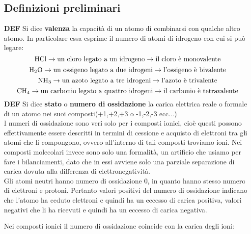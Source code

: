 \subsection{Definizioni preliminari}
\textbf{DEF} Si dice \textbf{valenza} la capacità di un atomo di combinarsi con qualche altro atomo. In particolare essa esprime il numero di atomi di idrogeno con cui si può legare:
$$\ce{HCl} \rightarrow \text{un cloro legato a un idrogeno} \rightarrow \text{il cloro è monovalente}$$
$$\ce{H_2O} \rightarrow \text{un ossigeno legato a due idrogeni} \rightarrow \text{l'ossigeno è bivalente}$$
$$\ce{NH_3} \rightarrow \text{un azoto legato a tre idrogeni} \rightarrow \text{l'azoto è trivalente}$$
$$\ce{CH_4} \rightarrow \text{un carbonio legato a quattro idrogeni} \rightarrow \text{il carbonio è tetravalente}$$
\textbf{DEF} Si dice \textbf{stato} o \textbf{numero di ossidazione} la carica elettrica reale o formale di un atomo nei suoi composti(+1,+2,+3 o -1,-2,-3 ecc...)\\

I numeri di ossidazione sono veri solo per i composti ionici, cioè questi possono effettivamente essere descritti in termini di cessione e acquisto di elettroni tra gli atomi che li compongono, ovvero all'interno di tali composti troviamo ioni. Nei composti molecolari invece sono solo una formalità, un artificio che usiamo per fare i bilanciamenti, dato che in essi avviene solo una parziale separazione di carica dovuta alla differenza di elettronegatività.\\

Gli atomi neutri hanno numero di ossidazione 0, in quanto hanno stesso numero di elettroni e protoni. Pertanto valori positivi del numero di ossidazione indicano che l'atomo ha ceduto elettroni e quindi ha un eccesso di carica positiva, valori negativi che li ha ricevuti e quindi ha un eccesso di carica negativa.


Nei composti ionici il numero di ossidazione coincide con la carica degli ioni:


